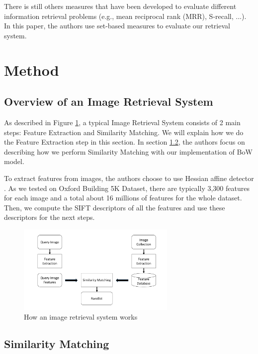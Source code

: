 \documentclass[10pt,conference,]{IEEEtran}
\begin{document}
There is still others measures that have been developed to evaluate different information retrieval problems \cite{journals/ires/CloughS13} (e.g., mean reciprocal rank (MRR), S-recall, ...). In this paper, the authors use set-based measures to evaluate our retrieval system.


\section{Method} \label{section:method}
\subsection{Overview of an Image Retrieval System}

As described in Figure \ref{fig:image_retrieval_system}, a typical Image Retrieval System consists of 2 main steps: Feature Extraction and Similarity Matching. We will explain how we do the Feature Extraction step in this section. In section \ref{section:similarity_extraction}, the authors focus on describing how we perform Similarity Matching with our implementation of BoW model.

To extract features from images, the authors choose to use Hessian affine detector \cite{Mikolajczyk2004}. As we tested on Oxford Building 5K Dataset, there are typically 3,300 features for each image and a total about 16 millions of features for the whole dataset. Then, we compute the SIFT descriptors \cite{Lowe2004} of all the features and use these descriptors for the next steps.

\begin{figure}
    \centering
    \includegraphics[width=3.0in]{ImageRetrievalSystem.pdf}
    \caption{How an image retrieval system works}
    \label{fig:image_retrieval_system}
\end{figure}

\subsection {Similarity Matching} \label{section:similarity_extraction}
\end{document}
